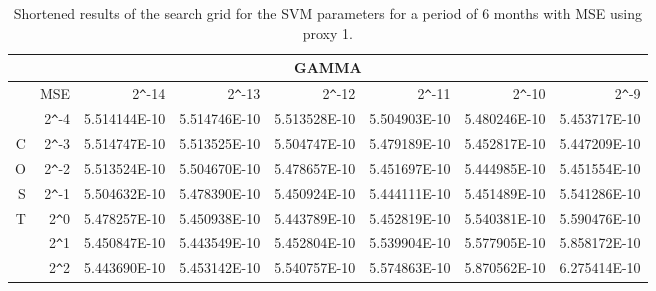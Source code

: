 \begin{table}[h!]
\centering
\begin{adjustbox}{width=\textwidth}
\begin{tabular}{|r|r|rrrrrr|}
\hline
\multicolumn{8}{|c|}{GAMMA} \tabularnewline
\hline
  &MSE&  2\verb|^|-14 & 2\verb|^|-13 & 2\verb|^|-12 & 2\verb|^|-11 & 2\verb|^|-10 & 2\verb|^|-9 \\ 
  \hline
  &2\verb|^|-4 & 5.514144E-10 & 5.514746E-10 & 5.513528E-10 & 5.504903E-10 & 5.480246E-10 & 5.453717E-10 \\ 
  C&2\verb|^|-3 & 5.514747E-10 & 5.513525E-10 & 5.504747E-10 & 5.479189E-10 & 5.452817E-10 & 5.447209E-10 \\ 
  O&2\verb|^|-2 & 5.513524E-10 & 5.504670E-10 & 5.478657E-10 & 5.451697E-10 & 5.444985E-10 & 5.451554E-10 \\ 
  S&2\verb|^|-1 & 5.504632E-10 & 5.478390E-10 & 5.450924E-10 & 5.444111E-10 & 5.451489E-10 & 5.541286E-10 \\ 
  T&2\verb|^|0 & 5.478257E-10 & 5.450938E-10 & 5.443789E-10 & 5.452819E-10 & 5.540381E-10 & 5.590476E-10 \\ 
  &2\verb|^|1 & 5.450847E-10 & 5.443549E-10 & 5.452804E-10 & 5.539904E-10 & 5.577905E-10 & 5.858172E-10 \\ 
  &2\verb|^|2 & 5.443690E-10 & 5.453142E-10 & 5.540757E-10 & 5.574863E-10 & 5.870562E-10 & 6.275414E-10 \\ 
   \hline
\end{tabular}
\end{adjustbox}
\caption{Shortened results of the search grid for the SVM parameters for a period of 6 months with MSE using proxy 1.}
\end{table}